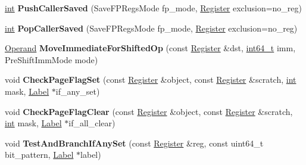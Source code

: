\begin{DoxyCompactItemize}
\item 
\mbox{\label{classv8_1_1internal_1_1TurboAssembler_a3000840055f8c25fa5abc392c06f2a50}} 
\mbox{\hyperlink{classint}{int}} {\bfseries Push\+Caller\+Saved} (Save\+F\+P\+Regs\+Mode fp\+\_\+mode, \mbox{\hyperlink{classv8_1_1internal_1_1Register}{Register}} exclusion=no\+\_\+reg)
\item 
\mbox{\label{classv8_1_1internal_1_1TurboAssembler_afc59aec994a76e4a69a6c9c698304d15}} 
\mbox{\hyperlink{classint}{int}} {\bfseries Pop\+Caller\+Saved} (Save\+F\+P\+Regs\+Mode fp\+\_\+mode, \mbox{\hyperlink{classv8_1_1internal_1_1Register}{Register}} exclusion=no\+\_\+reg)
\item 
\mbox{\label{classv8_1_1internal_1_1TurboAssembler_a7da8e53116cc0599f7c39da1946ea71c}} 
\mbox{\hyperlink{classv8_1_1internal_1_1Operand}{Operand}} {\bfseries Move\+Immediate\+For\+Shifted\+Op} (const \mbox{\hyperlink{classv8_1_1internal_1_1Register}{Register}} \&dst, \mbox{\hyperlink{classint64__t}{int64\+\_\+t}} imm, Pre\+Shift\+Imm\+Mode mode)
\item 
\mbox{\label{classv8_1_1internal_1_1TurboAssembler_a6620916755864e70e40b3cb49933cf26}} 
void {\bfseries Check\+Page\+Flag\+Set} (const \mbox{\hyperlink{classv8_1_1internal_1_1Register}{Register}} \&object, const \mbox{\hyperlink{classv8_1_1internal_1_1Register}{Register}} \&scratch, \mbox{\hyperlink{classint}{int}} mask, \mbox{\hyperlink{classv8_1_1internal_1_1Label}{Label}} $\ast$if\+\_\+any\+\_\+set)
\item 
\mbox{\label{classv8_1_1internal_1_1TurboAssembler_aa9a16cb38c13a749a2968120b702c6c7}} 
void {\bfseries Check\+Page\+Flag\+Clear} (const \mbox{\hyperlink{classv8_1_1internal_1_1Register}{Register}} \&object, const \mbox{\hyperlink{classv8_1_1internal_1_1Register}{Register}} \&scratch, \mbox{\hyperlink{classint}{int}} mask, \mbox{\hyperlink{classv8_1_1internal_1_1Label}{Label}} $\ast$if\+\_\+all\+\_\+clear)
\item 
\mbox{\label{classv8_1_1internal_1_1TurboAssembler_a650891ea6316a48cf457f9697d81a55a}} 
void {\bfseries Test\+And\+Branch\+If\+Any\+Set} (const \mbox{\hyperlink{classv8_1_1internal_1_1Register}{Register}} \&reg, const uint64\+\_\+t bit\+\_\+pattern, \mbox{\hyperlink{classv8_1_1internal_1_1Label}{Label}} $\ast$label)

\end{DoxyCompactItemize}
